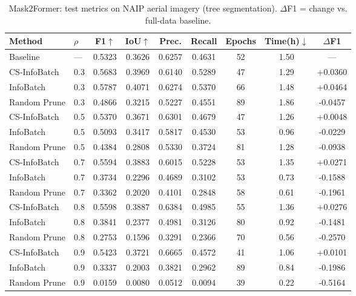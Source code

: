 \begin{table}[ht]
\centering
\small
\caption{Mask2Former: test metrics on NAIP aerial imagery (tree segmentation). $\Delta$F1 = change vs. full-data baseline.}
\label{tab:main_results_mask2former}
\begin{tabular}{llccccccc}
\toprule
Method & $\rho$ & F1$\uparrow$ & IoU$\uparrow$ & Prec. & Recall & Epochs & Time(h)$\downarrow$ & $\Delta$F1 \\
\midrule
Baseline & --- & 0.5323 & 0.3626 & 0.6257 & 0.4631 & 52 & 1.50 & --- \\
\midrule
CS-InfoBatch & 0.3 & 0.5683 & 0.3969 & 0.6140 & 0.5289 & 47 & 1.29 & +0.0360 \\
InfoBatch & 0.3 & 0.5787 & 0.4071 & 0.6274 & 0.5370 & 66 & 1.48 & +0.0464 \\
Random Prune & 0.3 & 0.4866 & 0.3215 & 0.5227 & 0.4551 & 89 & 1.86 & -0.0457 \\
\midrule
CS-InfoBatch & 0.5 & 0.5370 & 0.3671 & 0.6301 & 0.4679 & 47 & 1.26 & +0.0048 \\
InfoBatch & 0.5 & 0.5093 & 0.3417 & 0.5817 & 0.4530 & 53 & 0.96 & -0.0229 \\
Random Prune & 0.5 & 0.4384 & 0.2808 & 0.5330 & 0.3724 & 81 & 1.28 & -0.0938 \\
\midrule
CS-InfoBatch & 0.7 & 0.5594 & 0.3883 & 0.6015 & 0.5228 & 53 & 1.35 & +0.0271 \\
InfoBatch & 0.7 & 0.3734 & 0.2296 & 0.4689 & 0.3102 & 53 & 0.73 & -0.1588 \\
Random Prune & 0.7 & 0.3362 & 0.2020 & 0.4101 & 0.2848 & 58 & 0.61 & -0.1961 \\
\midrule
CS-InfoBatch & 0.8 & 0.5598 & 0.3887 & 0.6384 & 0.4985 & 55 & 1.36 & +0.0276 \\
InfoBatch & 0.8 & 0.3841 & 0.2377 & 0.4981 & 0.3126 & 80 & 0.92 & -0.1481 \\
Random Prune & 0.8 & 0.2753 & 0.1596 & 0.3291 & 0.2366 & 70 & 0.56 & -0.2570 \\
\midrule
CS-InfoBatch & 0.9 & 0.5423 & 0.3721 & 0.6665 & 0.4572 & 41 & 1.06 & +0.0101 \\
InfoBatch & 0.9 & 0.3337 & 0.2003 & 0.3821 & 0.2962 & 89 & 0.84 & -0.1986 \\
Random Prune & 0.9 & 0.0159 & 0.0080 & 0.0512 & 0.0094 & 39 & 0.22 & -0.5164 \\
\bottomrule
\end{tabular}
\end{table}